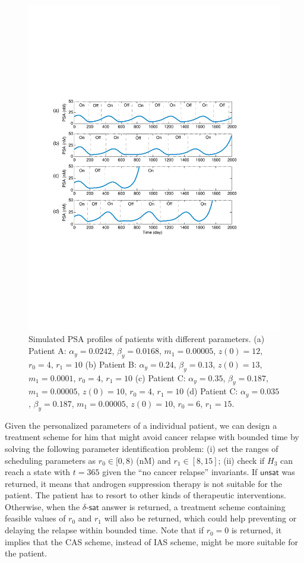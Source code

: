 \begin{figure}[htb]
\centering
\includegraphics[scale=0.52]{fig-prostatetraj2}
\caption{Simulated PSA profiles of patients with different parameters. (a) Patient A: $\alpha_y=0.0242$, $\beta_y=0.0168$, $m_1=0.00005$, $z(0)=12$, $r_0=4$, $r_1=10$ (b) Patient B: $\alpha_y=0.24$, $\beta_y=0.13$, $z(0)=13$, $m_1=0.0001$, $r_0=4$, $r_1=10$ (c) Patient C: $\alpha_y=0.35$, $\beta_y=0.187$, $m_1=0.00005$, $z(0)=10$, $r_0=4$, $r_1=10$ (d) Patient C: $\alpha_y=0.035$, $\beta_y=0.187$, $m_1=0.00005$, $z(0)=10$, $r_0=6$, $r_1=15$.}
\label{patients}
\end{figure}

Given the personalized parameters of a individual patient, we can design a treatment scheme for him that might avoid cancer relapse with bounded time by solving the following parameter identification problem: (i) set the ranges of scheduling parameters as $r_0 \in [0,8)$ (nM) and $r_1 \in [8,15]$; (ii) check if $H_3$ can reach a state with $t=365$ given the ``no cancer relapse'' invariants. If $\mathsf{unsat}$ was returned, it means that androgen suppression therapy is not suitable for the patient. The patient has to resort to other kinds of therapeutic interventions. Otherwise, when the $\delta$-$\mathsf{sat}$ answer is returned, a treatment scheme containing feasible values of $r_0$ and $r_1$ will also be returned, which could help preventing or delaying the relapse within bounded time. Note that if $r_0=0$ is returned, it implies that the CAS scheme, instead of IAS scheme, might be more suitable for the patient.

